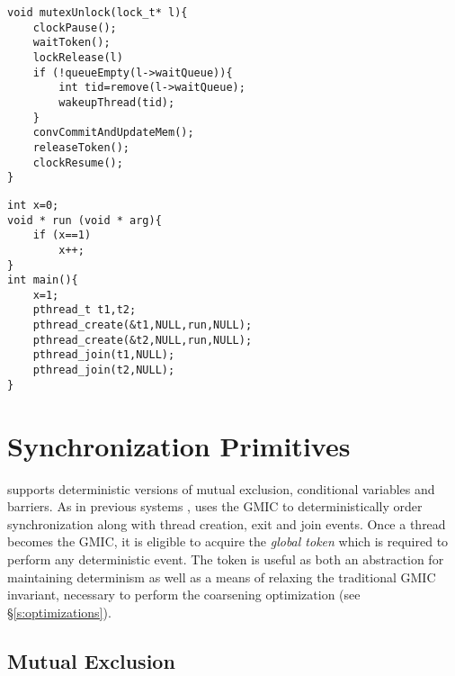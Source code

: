








\newsavebox{\mutexUnlock}
\begin{lrbox}{\mutexUnlock}%
\begin{lstlisting}
void mutexUnlock(lock_t* l){
	clockPause();
	waitToken();
	lockRelease(l)
	if (!queueEmpty(l->waitQueue)){
		int tid=remove(l->waitQueue);
		wakeupThread(tid);
	}
	convCommitAndUpdateMem();
	releaseToken();
	clockResume();
}
\end{lstlisting}
\end{lrbox}

\newsavebox{\codeSample}
\begin{lrbox}{\codeSample}%
\begin{lstlisting}
int x=0;
void * run (void * arg){
	if (x==1)
		x++;
}
int main(){
	x=1;
	pthread_t t1,t2;
	pthread_create(&t1,NULL,run,NULL);
	pthread_create(&t2,NULL,run,NULL);
	pthread_join(t1,NULL);
	pthread_join(t2,NULL);
}
\end{lstlisting}
\end{lrbox}




\section{Synchronization Primitives}
\label{s:sync}

\lib{} supports deterministic versions of mutual exclusion, conditional variables and barriers. As in previous systems \cite{olszewski_kendo:_2009,kai_lu_efficient_2014}, \lib{} uses the GMIC to deterministically order synchronization along with thread creation, exit and join events. Once a thread becomes the GMIC, it is eligible to acquire the \emph{global token} which is required to perform any deterministic event. The token is useful as both an abstraction for maintaining determinism as well as a means of relaxing the traditional GMIC invariant, necessary to perform the coarsening optimization (see \S\ref{s:optimizations}).


\subsection{Mutual Exclusion}

